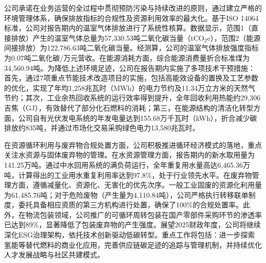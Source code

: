 \documentclass[a4paper,12pt]{article}
\begin{document}
公司承诺在业务运营的全过程中贯彻预防污染与持续改进的原则，通过建立严格的环境管理体系，确保排放指标的合规性及资源利用效率的最大化。基于ISO 14064标准，公司对报告期内的温室气体排放进行了系统性核算。数据显示，范围1（直接排放）产生的温室气体总量为57,330.53吨二氧化碳当量（tCO$_2$e），范围2（能源间接排放）为122,786.63吨二氧化碳当量。经测算，公司的温室气体排放强度指标为0.07吨二氧化碳/万元营收。在能源消耗方面，综合能源消费量折合标准煤为34,560.94吨。为降低上述环境足迹，公司在报告期内实施了多项技术干预措施：首先，通过7项重点节能技术改造项目的实施，包括高能效设备的置换及工艺参数的优化，实现了年均1,258兆瓦时（MWh）的电力节约及11.34万立方米的天然气节约；其次，工业余热回收系统的运行效率得到提升，全年回收利用热能约29,306吉焦（GJ），有效替代了部分化石燃料的消耗；第三，在能源结构的清洁化转型方面，公司自有光伏发电系统的年发电量达到155.68万千瓦时（kWh），折合减少碳排放约835吨，并通过市场化交易采购绿色电力13,580兆瓦时。

在资源循环利用与废弃物合规处置方面，公司积极推进循环经济模式的落地，重点关注水资源与固体废弃物的管理。在水资源管理方面，报告期内的新水取用量为141.25万吨。通过中水回用系统的满负荷运行，全年重复用水量高达6,465.36万吨，计算得出的工业用水重复利用率达到97.8\%，处于行业领先水平。在废弃物管理方面，遵循减量化、资源化、无害化的优先次序。一般工业固废的资源化利用量为61,485.76吨；对于危险废物（产生量为4,110.84吨），公司严格执行转移联单制度，委托具备相应资质的第三方机构进行处置，确保了100\%的合规处置率。此外，在物流包装领域，公司推广的可循环周转包装在国产零部件采购环节的渗透率已达到89\%，显著降低了包装废弃物的产生强度。展望2025财政年度，公司将继续深化ESG治理架构，依托技术创新驱动低碳转型。重点工作将包括：进一步探索氢能等替代燃料的商业化应用，完善供应链碳足迹的追踪与管理机制，并持续优化人才发展战略与社区共建模式。

\vspace{3cm}
\end{document}
